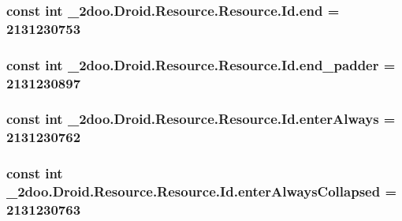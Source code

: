\hypertarget{class__2doo_1_1_droid_1_1_resource_1_1_id_70d48f2ab4dac16615dffb12c4e1541b}{
\subsubsection[{end}]{\setlength{\rightskip}{0pt plus 5cm}const int \_\-2doo.Droid.Resource.Resource.Id.end = 2131230753}}
\label{class__2doo_1_1_droid_1_1_resource_1_1_id_70d48f2ab4dac16615dffb12c4e1541b}


\hypertarget{class__2doo_1_1_droid_1_1_resource_1_1_id_5c9107b54882adcda2ba0c13720c8003}{
\subsubsection[{end\_\-padder}]{\setlength{\rightskip}{0pt plus 5cm}const int \_\-2doo.Droid.Resource.Resource.Id.end\_\-padder = 2131230897}}
\label{class__2doo_1_1_droid_1_1_resource_1_1_id_5c9107b54882adcda2ba0c13720c8003}


\hypertarget{class__2doo_1_1_droid_1_1_resource_1_1_id_0aabbc1bee16bccae2fc6e20118e0d28}{
\subsubsection[{enterAlways}]{\setlength{\rightskip}{0pt plus 5cm}const int \_\-2doo.Droid.Resource.Resource.Id.enterAlways = 2131230762}}
\label{class__2doo_1_1_droid_1_1_resource_1_1_id_0aabbc1bee16bccae2fc6e20118e0d28}


\hypertarget{class__2doo_1_1_droid_1_1_resource_1_1_id_b97c0a7c634db7b2404810f666affb6d}{
\subsubsection[{enterAlwaysCollapsed}]{\setlength{\rightskip}{0pt plus 5cm}const int \_\-2doo.Droid.Resource.Resource.Id.enterAlwaysCollapsed = 2131230763}}
\label{class__2doo_1_1_droid_1_1_resource_1_1_id_b97c0a7c634db7b2404810f666affb6d}


